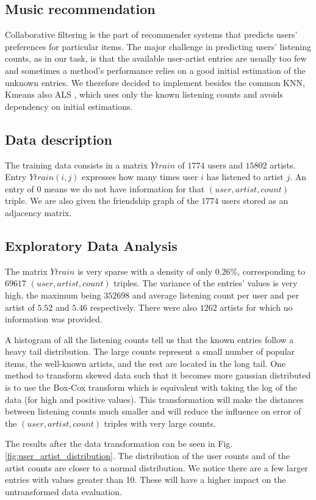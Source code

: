 \subsection{Music recommendation}
Collaborative filtering is the part of recommender systems that predicts users' preferences for particular items. The major challenge in predicting users' listening counts, as in our task, is that the available user-artist entries are usually too few and sometimes a method's performance relies on a good initial estimation of the unknown entries. 
We therefore decided to implement besides the common KNN, Kmeans also ALS \cite{Zhou:2008}, which uses only the known listening counts and avoids dependency on initial estimations.

\subsection{Data description}
The training data consists in a matrix $Ytrain$ of $1774$ users and $15802$ artists. Entry $Ytrain(i,j)$ expresses how many times user $i$ has listened to artist $j$. An entry of 0 means we do not have information for that $(user, artist, count)$ triple. We are also given the friendship graph of the $1774$ users stored as an adjacency matrix.

\subsection{Exploratory Data Analysis}

The matrix $Ytrain$ is very sparse with a density of only $0.26\%$, corresponding to $69617$ $(user, artist, count)$ triples. The variance of the entries' values is very high, the maximum  being $352698$ and average listening count per user and per artist of $5.52$ and $5.46$ respectively. There were also $1262$ artists for which no information was provided. \par \noindent A histogram of all the listening counts tell us that the known entries follow a heavy tail distribution. The large counts represent a small number of popular items, the well-known artists, and the rest are located in the long tail. One method to transform skewed data such that it becomes more gaussian distributed is to use the Box-Cox transform which is equivalent with taking the log of the data (for  high and positive values). This transformation will make the distances between listening counts much smaller and will reduce the influence on error of the $(user,artist,count)$ triples with very large counts.
\par The results after the data transformation can be seen in Fig. \ref{fig:user_artist_distribution}. The distribution of the user counts and of the artist counts are closer to a normal distribution. We notice there are a few larger entries with values greater than 10. These will have a higher impact on the untransformed data evaluation. 

